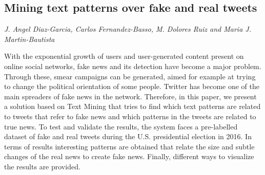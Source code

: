 \documentclass[../booklet.tex]{subfiles}
\begin{document}
\subsection[Mining text patterns over fake and real tweets. {\it J. Angel Diaz-Garcia, Carlos Fernandez-Basso, M. Dolores Ruiz and Maria J. Martin-Bautista}]{Mining text patterns over fake and real tweets}
   

\begin{center}
  {\it J. Angel Diaz-Garcia, Carlos Fernandez-Basso, M. Dolores Ruiz and Maria J. Martin-Bautista}
\end{center}

\vskip 0.8cm


	
With the exponential growth of users and user-generated content present on online social networks, fake  news and its detection have become a major problem. Through these, smear campaigns can be generated, aimed for example at trying to change the political orientation of some people. Twitter has become one of the main spreaders of fake news in the network. Therefore, in this paper, we present a solution based on Text Mining that tries to find which text patterns are related to tweets that refer to fake news and which patterns in the tweets are related to true news. To test and validate the results, the system faces a pre-labelled dataset of fake and real tweets during the U.S. presidential election in 2016. In terms of results interesting patterns are obtained that relate the size and subtle changes of the real news to create fake news. Finally, different ways to visualize the results are provided. 	

\end{document}
